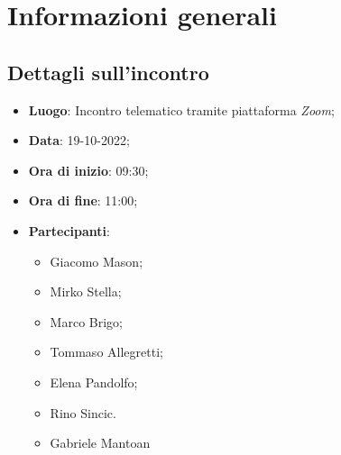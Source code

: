 \section{Informazioni generali}

\subsection{Dettagli sull'incontro}
\begin{itemize}
\item \textbf{Luogo}: Incontro telematico tramite piattaforma \textit{Zoom};
\item \textbf{Data}: 19-10-2022;
\item \textbf{Ora di inizio}: 09:30;
\item \textbf{Ora di fine}: 11:00;
\item \textbf{Partecipanti}: 
\begin{itemize}
	\item Giacomo Mason;
	\item Mirko Stella;
	\item Marco Brigo;
	\item Tommaso Allegretti;
	\item Elena Pandolfo;
	\item Rino Sincic.
	\item Gabriele Mantoan
\end{itemize}
\end{itemize}




